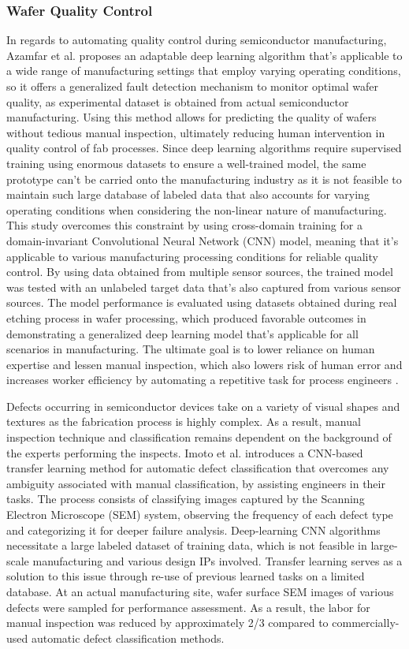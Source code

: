 \subsubsection{Wafer Quality Control} 
In regards to automating quality control during semiconductor manufacturing, Azamfar et al. \cite{Azamfar2020DeepLD} proposes an adaptable deep learning algorithm that’s applicable to a wide range of manufacturing settings that employ varying operating conditions, so it offers a generalized fault detection mechanism to monitor optimal wafer quality, as experimental dataset is obtained from actual semiconductor manufacturing. Using this method allows for predicting the quality of wafers without tedious manual inspection, ultimately reducing human intervention in quality control of fab processes. Since deep learning algorithms require supervised training using enormous datasets to ensure a well-trained model, the same prototype can’t be carried onto the manufacturing industry as it is not feasible to maintain such large database of labeled data that also accounts for varying operating conditions when considering the non-linear nature of manufacturing. This study overcomes this constraint by using cross-domain training for a domain-invariant Convolutional Neural Network (CNN) model, meaning that it’s applicable to various manufacturing processing conditions for reliable quality control. By using data obtained from multiple sensor sources, the trained model was tested with an unlabeled target data that’s also captured from various sensor sources. The model performance is evaluated using datasets obtained during real etching process in wafer processing, which produced favorable outcomes in demonstrating a generalized deep learning model that’s applicable for all scenarios in manufacturing.  The ultimate goal is to lower reliance on human expertise and lessen manual inspection, which also lowers risk of human error and increases worker efficiency by automating a repetitive task for process engineers \cite{Azamfar2020DeepLD}.

Defects occurring in semiconductor devices take on a variety of visual shapes and textures as the fabrication process is highly complex. As a result, manual inspection technique and classification remains dependent on the background of the experts performing the inspects. Imoto et al. \cite{Imoto2018ACT}  introduces a CNN-based transfer learning method for automatic defect classification that overcomes any ambiguity associated with manual classification, by assisting engineers in their tasks. The process consists of classifying images captured by the Scanning Electron Microscope (SEM) system, observing the frequency of each defect type and categorizing it for deeper failure analysis. Deep-learning CNN algorithms necessitate a large labeled dataset of training data, which is not feasible in large-scale manufacturing and various design IPs involved. Transfer learning serves as a solution to this issue through re-use of previous learned tasks on a limited database. At an actual manufacturing site, wafer surface SEM images of various defects were sampled for performance assessment. As a result, the labor for manual inspection was reduced by approximately 2/3 compared to commercially-used automatic defect classification methods.

